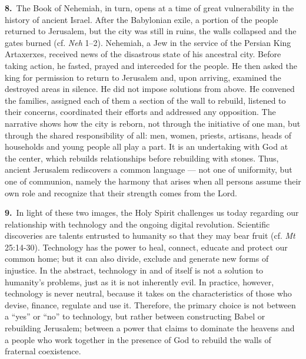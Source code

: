 \documentclass{article}
\begin{document}
\textbf{8.}\ The Book of Nehemiah, in turn, opens at a time of great vulnerability in the history of ancient Israel. After the Babylonian exile, a portion of the people returned to Jerusalem, but the city was still in ruins, the walls collapsed and the gates burned (cf. \emph{Neh} 1--2). Nehemiah, a Jew in the service of the Persian King Artaxerxes, received news of the disastrous state of his ancestral city. Before taking action, he fasted, prayed and interceded for the people. He then asked the king for permission to return to Jerusalem and, upon arriving, examined the destroyed areas in silence. He did not impose solutions from above. He convened the families, assigned each of them a section of the wall to rebuild, listened to their concerns, coordinated their efforts and addressed any opposition. The narrative shows how the city is reborn, not through the initiative of one man, but through the shared responsibility of all: men, women, priests, artisans, heads of households and young people all play a part. It is an undertaking with God at the center, which rebuilds relationships before rebuilding with stones. Thus, ancient Jerusalem rediscovers a common language --- not one of uniformity, but one of communion, namely the harmony that arises when all persons assume their own role and recognize that their strength comes from the Lord.

\textbf{9.}\ In light of these two images, the Holy Spirit challenges us today regarding our relationship with technology and the ongoing digital revolution. Scientific discoveries are talents entrusted to humanity so that they may bear fruit (cf. \emph{Mt} 25:14-30). Technology has the power to heal, connect, educate and protect our common home; but it can also divide, exclude and generate new forms of injustice. In the abstract, technology in and of itself is not a solution to humanity's problems, just as it is not inherently evil. In practice, however, technology is never neutral, because it takes on the characteristics of those who devise, finance, regulate and use it. Therefore, the primary choice is not between a ``yes'' or ``no'' to technology, but rather between constructing Babel or rebuilding Jerusalem; between a power that claims to dominate the heavens and a people who work together in the presence of God to rebuild the walls of fraternal coexistence.
\end{document}
